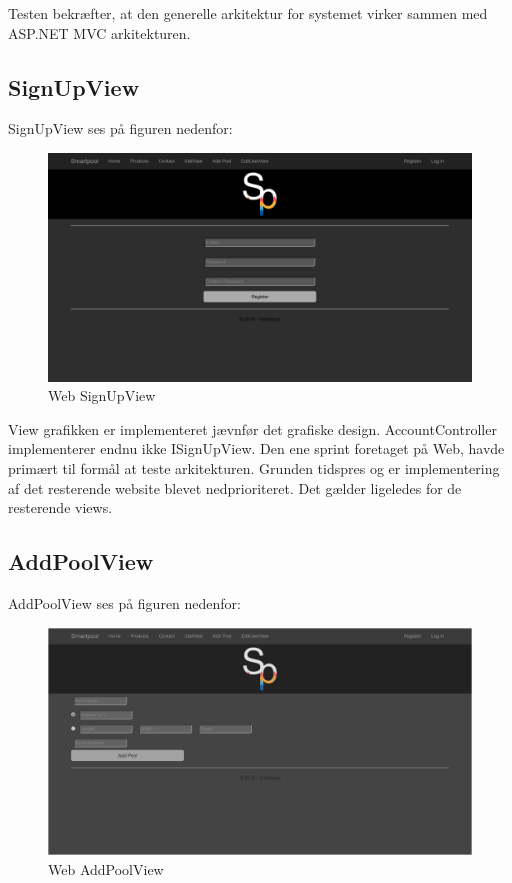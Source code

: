 Testen bekræfter, at den generelle arkitektur for systemet virker sammen med ASP.NET MVC arkitekturen. 
 
\subsection{SignUpView}\label{sec: signupview}
SignUpView ses på figuren nedenfor:

\begin{figure}
	\centering
	\includegraphics[width=1.0\linewidth]{figs/implementering/web_signupview}
	\caption{Web SignUpView}
	\label{fig:websignupview}
\end{figure}

View grafikken er implementeret jævnfør det grafiske design. AccountController implementerer endnu ikke ISignUpView. Den ene sprint foretaget på Web, havde primært til formål at teste arkitekturen. Grunden tidspres og er implementering af det resterende website blevet nedprioriteret. Det gælder ligeledes for de resterende views.

\subsection{AddPoolView}
AddPoolView ses på figuren nedenfor:

\begin{figure}
	\centering
	\includegraphics[width=1.0\linewidth]{figs/implementering/web_addpoolview}
	\caption{Web AddPoolView}
	\label{fig:webaddpoolview}
\end{figure}

